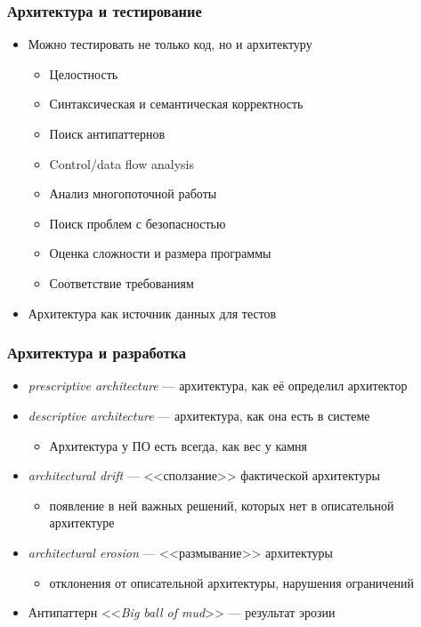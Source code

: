 \documentclass[xetex,mathserif,serif]{beamer}
\begin{document}
	\begin{frame}
		\frametitle{Архитектура и тестирование}
		\begin{itemize}
			\item Можно тестировать не только код, но и архитектуру
			\begin{itemize}
				\item Целостность
				\item Синтаксическая и семантическая корректность
				\item Поиск антипаттернов
				\item Control/data flow analysis
				\item Анализ многопоточной работы
				\item Поиск проблем с безопасностью
				\item Оценка сложности и размера программы
				\item Соответствие требованиям
			\end{itemize}
			\item Архитектура как источник данных для тестов
		\end{itemize}
	\end{frame}

	\begin{frame}
		\frametitle{Архитектура и разработка}
		\begin{itemize}
			\item \emph{prescriptive architecture} --- архитектура, как её определил архитектор
			\item \emph{descriptive architecture} --- архитектура, как она есть в системе
			\begin{itemize}
				\item Архитектура у ПО есть всегда, как вес у камня
			\end{itemize}
			\item \emph{architectural drift} --- <<сползание>> фактической архитектуры
			\begin{itemize}
				\item появление в ней важных решений, которых нет в описательной архитектуре
			\end{itemize}
			\item \emph{architectural erosion} --- <<размывание>> архитектуры
			\begin{itemize}
				\item отклонения от описательной архитектуры, нарушения ограничений
			\end{itemize}
			\item Антипаттерн <<\emph{Big ball of mud}>> --- результат эрозии
		\end{itemize}
	\end{frame}
\end{document}
